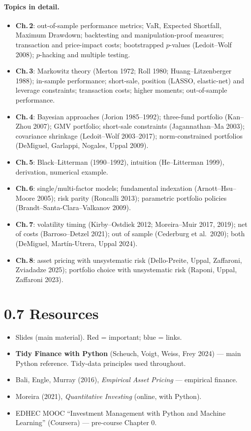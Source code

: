 \documentclass[11pt,a4paper]{report}
\begin{document}
\paragraph{Topics in detail.}
\begin{itemize}
  \item \textbf{Ch.\,2}: out-of-sample performance metrics; VaR, Expected
    Shortfall, Maximum Drawdown; backtesting and manipulation-proof measures;
    transaction and price-impact costs; bootstrapped $p$-values (Ledoit--Wolf
    2008); $p$-hacking and multiple testing.
  \item \textbf{Ch.\,3}: Markowitz theory (Merton 1972; Roll 1980;
    Huang--Litzenberger 1988); in-sample performance; short-sale, position
    (LASSO, elastic-net) and leverage constraints; transaction costs; higher
    moments; out-of-sample performance.
  \item \textbf{Ch.\,4}: Bayesian approaches (Jorion 1985--1992); three-fund
    portfolio (Kan--Zhou 2007); GMV portfolio; short-sale constraints
    (Jagannathan--Ma 2003); covariance shrinkage (Ledoit--Wolf 2003--2017);
    norm-constrained portfolios (DeMiguel, Garlappi, Nogales, Uppal 2009).
  \item \textbf{Ch.\,5}: Black--Litterman (1990--1992), intuition (He--Litterman
    1999), derivation, numerical example.
  \item \textbf{Ch.\,6}: single/multi-factor models; fundamental indexation
    (Arnott--Hsu--Moore 2005); risk parity (Roncalli 2013); parametric
    portfolio policies (Brandt--Santa-Clara--Valkanov 2009).
  \item \textbf{Ch.\,7}: volatility timing (Kirby--Ostdiek 2012; Moreira--Muir
    2017, 2019); net of costs (Barroso--Detzel 2021); out of sample
    (Cederburg et al.\ 2020); both (DeMiguel, Mart\'in-Utrera, Uppal 2024).
  \item \textbf{Ch.\,8}: asset pricing with unsystematic risk
    (Dello-Preite, Uppal, Zaffaroni, Zviadadze 2025); portfolio choice with
    unsystematic risk (Raponi, Uppal, Zaffaroni 2023).
\end{itemize}

\section*{0.7 Resources}
\begin{itemize}
  \item Slides (main material). Red = important; blue = links.
  \item \textbf{Tidy Finance with Python} (Scheuch, Voigt, Weiss, Frey 2024) ---
        main Python reference. Tidy-data principles used throughout.
  \item Bali, Engle, Murray (2016), \emph{Empirical Asset Pricing} --- empirical finance.
  \item Moreira (2021), \emph{Quantitative Investing} (online, with Python).
  \item EDHEC MOOC ``Investment Management with Python and Machine Learning''
        (Coursera) --- pre-course Chapter 0.
\end{itemize}
\end{document}
